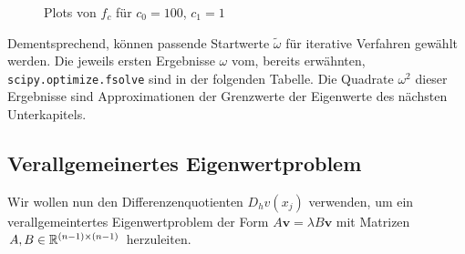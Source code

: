 \begin{figure}[H]
  \centering
  \hspace{0mm}
  \caption{Plots von $f_c$ für $c_0 = 100$, $c_1 = 1$}
  \label{fig:zero_function}
\end{figure}

Dementsprechend, können passende Startwerte $\tilde{\omega}$ für iterative Verfahren gewählt werden. Die jeweils ersten Ergebnisse $\omega$ vom, bereits erwähnten, \verb|scipy.optimize.fsolve| sind in der folgenden Tabelle. Die Quadrate $\omega^2$ dieser Ergebnisse sind Approximationen der Grenzwerte der Eigenwerte des nächsten Unterkapitels. \\


\vspace{10pt}

\subsection{Verallgemeinertes Eigenwertproblem}

Wir wollen nun den Differenzenquotienten $D_h v(x_j)$ verwenden, um ein verallgemeintertes Eigenwertproblem der Form $A \mathbf{v} = \lambda B \mathbf{v}$ mit Matrizen $A, B \in \mathbb{R}^{(n-1) \times (n-1)}$ herzuleiten. \\

